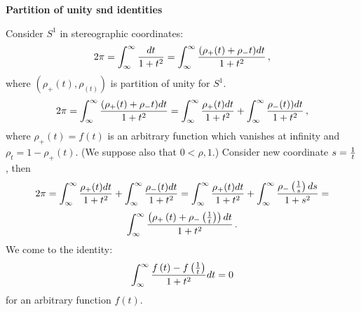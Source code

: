 

\baselineskip=14pt

\def\A {{\bf A}} 
\def\B {{\cal B}}
\def\C {{\bf C}}
\def\CC {{\cal C}}
\def\Cl {{\tt \hbox{Cliff}}}
\def\E {{\bf E}}
\def\EE {{\cal E}}
\def\F {{\cal F}}
\def\FF {{\cal F}}
\def\G {\Gamma}
\def\GG {{\cal G}}
\def\H {{\bf H}}
\def\K {{\bf K}}
\def\L {{\cal L}}
\def\M {{\cal M}}
\def\N {{\bf N}}
\def\R {{\bf R}}
\def\Sb {{\bf S}}
\def\SS {{\cal S}}
\def\Tr {{\rm Tr\,}}
\def\V {{\cal V}}
\def\X {{\bf X}}
\def\XX {{\cal X}}
\def\Y {{\bf Y}}
\def\Z {{\bf Z}}

\def\a {\alpha}
\def\ac {{\bf a}}
\def\b {{\bf b}}
\def\bs {{\bf s}}
\def\c {{\bf c}}
\def\d {\delta}
\def\dist {{\tt \hbox{distance}}}
\def\e {{\bf e}}
\def\f {{\bf f}}
\def\finish {\blacksquare}
\def\g {{\bf g}}
\def\grad {{\rm grad\,}}
\def\h {\hbar}
\def\k {{\bf k}}
\def\l {{\bf l}}
\def\m {{\bf m}}
\def\n {{\bf n}}
\def\p {\partial}
\def\pb {{\bf p}}
\def\pt {{\bf pt}}
\def\q {{\bf q}}
\def\r {{\bf r}}
\def\s {\sigma}
\def\t {{\bf t}}
\def\tS {{\tilde \Sigma}}
\def\td {\tilde}
\def\v {{\bf v}}
\def\vare {\varepsilon}
\def\x {{\bf x}}
\def\y {{\bf y}}
\def\w {\omega}


\centerline{\bf Partition of unity snd identities}

Consider $S^1$ in stereographic coordinates:
        $$
2\pi=
\int_\infty^\infty {dt\over 1+t^2}
=
\int_\infty^\infty {(\rho_+(t)+\rho_-{t})dt\over
1+t^2}\,,
        $$
where $(\rho_+(t),\rho_(t))$ is partition of unity for
$S^1$. 
         $$
2\pi=
\int_\infty^\infty {(\rho_+(t)+\rho_-{t})dt\over
1+t^2}=
\int_\infty^\infty {\rho_+(t)dt\over
1+t^2}+
\int_\infty^\infty {\rho_-(t))dt\over
1+t^2}\,,
         $$
where $\rho_+(t)=f(t)$ is an arbitrary function which
vanishes at infinity and $\rho_{t}=1-\rho_+(t)$.
(We suppose also that $0<\rho,1$.)
Consider new coordinate $s={1\over t}$, then
         $$
2\pi=
\int_\infty^\infty {\rho_+(t)dt\over
1+t^2}+
\int_\infty^\infty {\rho_-(t)dt\over
1+t^2}=
\int_\infty^\infty {\rho_+(t)dt\over
1+t^2}+
\int_\infty^\infty {\rho_-\left({1\over s}\right)ds\over
1+s^2}=
         $$
   $$
\int_\infty^\infty {
\left(
\rho_+
\left(t\right)
+
\rho_-\left({1\over t}\right)
\right)dt\over
1+t^2}\,.
         $$
We come to the identity:
           $$
\int_\infty^\infty 
      {
f
\left(t\right)
-
f\left({1\over t}\right)
 \over 1+t^2
}dt=0
          $$
for an arbitrary function $f(t)$.


\bye
